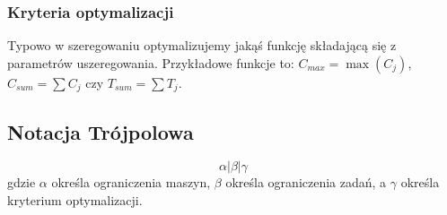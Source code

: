 \documentclass{../notatki}
\begin{document}
\subsubsection{Kryteria optymalizacji}

Typowo w szeregowaniu optymalizujemy jakąś funkcję składającą się z
parametrów uszeregowania. Przykładowe funkcje to:
$C_{max}=\max(C_j)$, $C_{sum} = \sum C_j$ czy $T_{sum} = \sum T_j$.

\subsection{Notacja Trójpolowa}

$$
\alpha | \beta | \gamma
$$
gdzie $\alpha$ określa ograniczenia maszyn, $\beta$ określa ograniczenia
zadań, a $\gamma$ określa kryterium optymalizacji.
\end{document}
